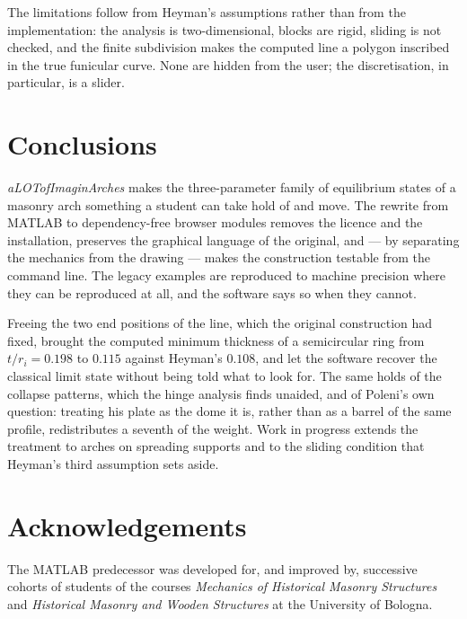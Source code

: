 \documentclass[final,3p,times,twocolumn]{elsarticle}
\begin{document}
The limitations follow from Heyman's assumptions rather than from the
implementation: the analysis is two-dimensional, blocks are rigid, sliding is
not checked, and the finite subdivision makes the computed line a polygon
inscribed in the true funicular curve. None are hidden from the user; the
discretisation, in particular, is a slider.


\section{Conclusions}

\emph{aLOTofImaginArches} makes the three-parameter family of equilibrium
states of a masonry arch something a student can take hold of and move. The
rewrite from MATLAB to dependency-free browser modules removes the licence and
the installation, preserves the graphical language of the original, and --- by
separating the mechanics from the drawing --- makes the construction testable
from the command line. The legacy examples are reproduced to machine precision
where they can be reproduced at all, and the software says so when they cannot.

Freeing the two end positions of the line, which the original construction had
fixed, brought the computed minimum thickness of a semicircular ring from
$t/r_i = 0.198$ to $0.115$ against Heyman's $0.108$, and let the software
recover the classical limit state without being told what to look for. The same
holds of the collapse patterns, which the hinge analysis finds unaided, and of
Poleni's own question: treating his plate as the dome it is, rather than as a
barrel of the same profile, redistributes a seventh of the weight. Work in
progress extends the treatment to arches on spreading supports and to the
sliding condition that Heyman's third assumption sets aside.

\section*{Acknowledgements}

The MATLAB predecessor was developed for, and improved by, successive cohorts
of students of the courses \emph{Mechanics of Historical Masonry Structures}
and \emph{Historical Masonry and Wooden Structures} at the University of
Bologna.



\end{document}
